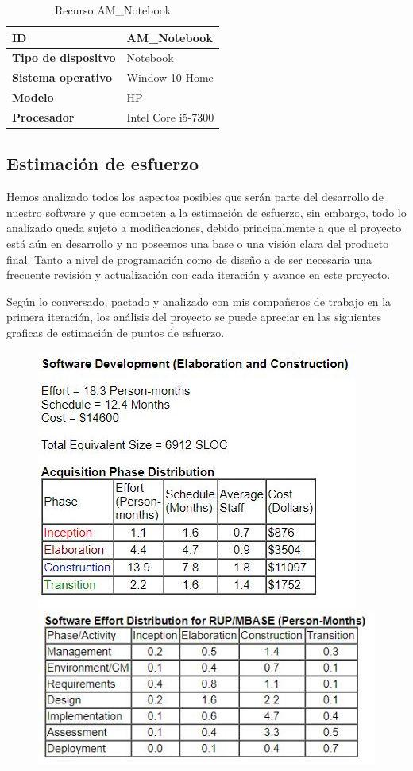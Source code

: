 \begin{table}[H]
    \centering
        \begin{tabular}{|l | p{12cm} |}        
        \hline
        \textbf{ID} & AM\_Notebook \\
        \hline
        \textbf{Tipo de dispositvo} & Notebook \\
        \hline
        \textbf{Sistema operativo} & Window 10 Home \\
        \hline
        \textbf{Modelo} & HP \\
        \hline
        \textbf{Procesador} & Intel Core i5-7300 \\    
        \hline            
        \end{tabular}
    \caption{Recurso AM\_Notebook}
\end{table}

\subsection{Estimación de esfuerzo}
Hemos analizado todos los aspectos posibles que serán parte del desarrollo de nuestro software y que competen a la estimación de esfuerzo, sin embargo, todo lo analizado queda sujeto a modificaciones, debido principalmente a que el proyecto está aún en desarrollo y no poseemos una base o una visión clara del producto final. Tanto a nivel de programación como de diseño a de ser necesaria una frecuente revisión y actualización con cada iteración y avance en este proyecto.

Según lo conversado, pactado y analizado con mis compañeros de trabajo en la primera iteración, los análisis del proyecto se puede apreciar en las siguientes graficas de estimación de puntos de esfuerzo.
\begin{figure}[htbp]
	\includegraphics{imgs/1.JPG}
	\includegraphics[scale=0.9]{imgs/2.JPG}
\end{figure}

